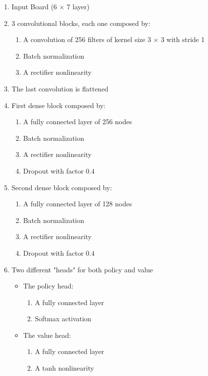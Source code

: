 \documentclass{article}
\begin{document}
\begin{enumerate}
	\item Input Board (6 $\times$ 7 layer)
	
	\item 3 convolutional blocks, each one composed by:
	\begin{enumerate}
		\item A convolution of 256 filters of kernel size 3 $\times$ 3 with stride 1
		\item Batch normalization
		\item A rectifier nonlinearity
	\end{enumerate}
	
	\item The last convolution is flattened
	\item First dense block composed by:
	\begin{enumerate}
		\item A fully connected layer of 256 nodes
		\item Batch normalization
		\item A rectifier nonlinearity
		\item Dropout with factor $0.4$
	\end{enumerate}
	
	\item Second dense block composed by:
	\begin{enumerate}
		\item A fully connected layer of 128 nodes
		\item Batch normalization
		\item A rectifier nonlinearity
		\item Dropout with factor $0.4$
	\end{enumerate}

	\item Two different "heads" for both policy and value
	\begin{itemize}
		\item The policy head:
		\begin{enumerate}
			\item A fully connected layer
			\item Softmax activation
		\end{enumerate}
		
		\item The value head:
		\begin{enumerate}
			\item A fully connected layer
			\item A tanh nonlinearity
		\end{enumerate}
	\end{itemize}

\end{enumerate}
\end{document}
